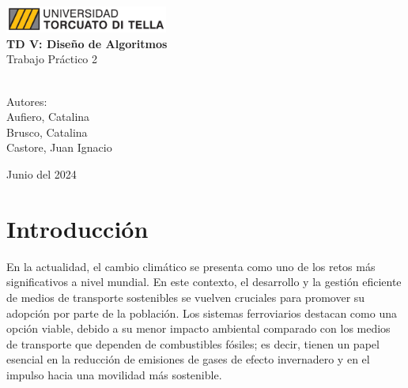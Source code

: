 \documentclass{article}
\begin{document}
    \begin{titlepage}
        \centering
        \vspace*{0.5cm}
        \vspace{1cm}
        \includegraphics[width=0.4\textwidth]{utdt-logo.jpg} \\
        \vspace{1cm}
        \Large{\bfseries{TD V: Diseño de Algoritmos}}\\
        \vspace{0.8cm}
        \Large{Trabajo Práctico 2}\\
        \vspace{0.5cm}
         \\
        \vspace{6cm}
        
        \Large{Autores:}\\
        \vspace{0.5cm}
        \Large{Aufiero, Catalina}\\
        \vspace{0.2cm}
        \Large{Brusco, Catalina}\\
        \vspace{0.2cm}
        \Large{Castore, Juan Ignacio}\\

        
        \vfill
        
        \large{Junio del 2024}
    \end{titlepage} 

\section{Introducción}
    \vspace{0.5cm}
    En la actualidad, el cambio climático se presenta como uno de los retos más significativos a nivel mundial. En este contexto, el desarrollo y la gestión eficiente de medios de transporte sostenibles se vuelven cruciales para promover su adopción por parte de la población. Los sistemas ferroviarios destacan como una opción viable, debido a su menor impacto ambiental comparado con los medios de transporte que dependen de combustibles fósiles; es decir, tienen un papel esencial en la reducción de emisiones de gases de efecto invernadero y en el impulso hacia una movilidad más sostenible.
\end{document}
